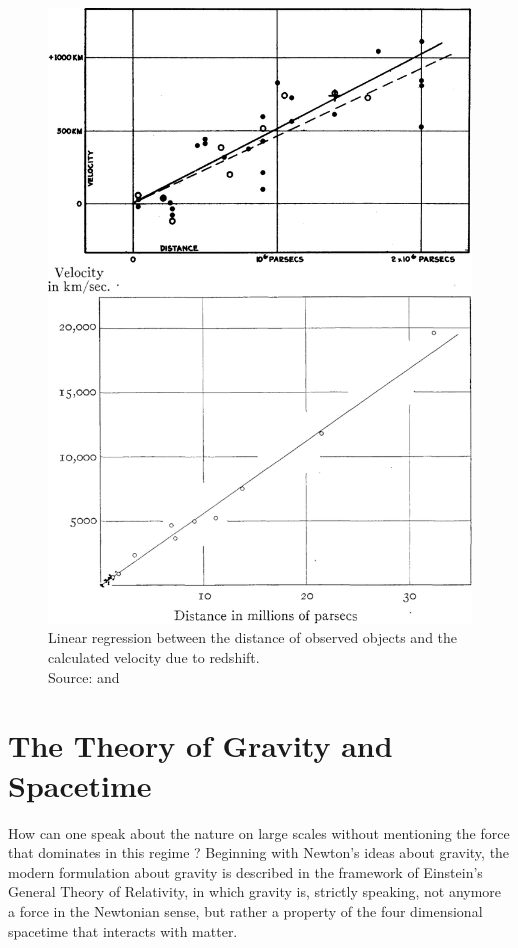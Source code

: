 \begin{figure}[H]
\begin{minipage}{8cm}
        \includegraphics[scale=0.17]{figures/images/hubble_distance-vs-velocity.png}
        \caption{Linear regression between the distance of observed objects and the calculated velocity due to redshift. \\ 
        Source: \cite{Hubble1929} and \cite[Figure 5]{Hubble1931}}
        \label{fig:hubble-law}
    \end{minipage}    
\end{figure}



\section{The Theory of Gravity and Spacetime}
How can one speak about the nature on large scales without mentioning the force that dominates in this regime ?
Beginning with Newton's ideas about gravity, the modern formulation about gravity is described in the framework of Einstein's General Theory of Relativity, in which gravity is, strictly speaking, not anymore a force in the Newtonian sense, but rather a property of the four dimensional spacetime that interacts with matter. \\

